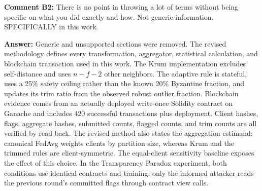 \documentclass[10pt,letterpaper]{article}
\begin{document}
\textbf{Comment B2:} There is no point in throwing a lot of terms without being
specific on what you did exactly and how. Not generic information. SPECIFICALLY
in this work.

\textbf{Answer:} Generic and unsupported sections were removed. The revised
methodology defines every transformation, aggregator, statistical calculation,
and blockchain transaction used in this work. The Krum implementation excludes
self-distance and uses $n-f-2$ other neighbors. The adaptive rule is stateful,
uses a 25\% safety ceiling rather than the known 20\% Byzantine fraction, and
updates its trim ratio from the observed robust outlier fraction. Blockchain
evidence comes from an actually deployed write-once Solidity contract on Ganache
and includes 420 successful transactions plus deployment. Client hashes, flags,
aggregate hashes, submitted counts, flagged counts, and trim counts are all
verified by read-back. The revised method also states the aggregation estimand:
canonical FedAvg weights clients by partition size, whereas Krum and the trimmed
rules are client-symmetric. The equal-client sensitivity baseline exposes the
effect of this choice. In the Transparency Paradox experiment, both conditions
use identical contracts and training; only the informed attacker reads the
previous round's committed flags through contract view calls.
\end{document}
